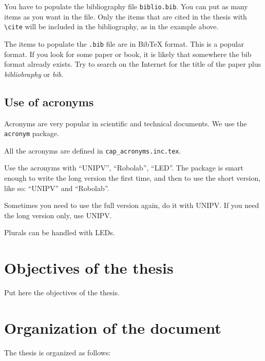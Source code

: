 You have to populate the bibliography file \texttt{biblio.bib}.
You can put as many items as you want in the file.
Only the items that are cited in the thesis with \texttt{\textbackslash cite} will be included in the bibliography, as in the example above.

The items to populate the \texttt{.bib} file are in BibTeX format.
This is a popular format.
If you look for some paper or book, it is likely that somewhere the bib format already exists.
Try to search on the Internet for the title of the paper plus \textit{bibliobraphy} or \textit{bib}.

\subsection{Use of acronyms}

Acronyms are very popular in scientific and technical documents.
We use the \texttt{acronym} package.

All the acronyms are defined in \texttt{cap\_acronyms.inc.tex}.

Use the acronyms with \enquote{\ac{UNIPV}}, \enquote{\ac{Robolab}}, \enquote{\ac{LED}}.
The package is smart enough to write the long version the first time, and then to use the short version, like so: \enquote{\ac{UNIPV}} and \enquote{\ac{Robolab}}.

Sometimes you need to use the full version again, do it with \acf{UNIPV}.
If you need the long version only, use \acl{UNIPV}.

Plurals can be handled with \acp{LED}.

\section{Objectives of the thesis}

%
%
Put here the objectives of the thesis.

\section{Organization of the document}

The thesis is organized as follows:

